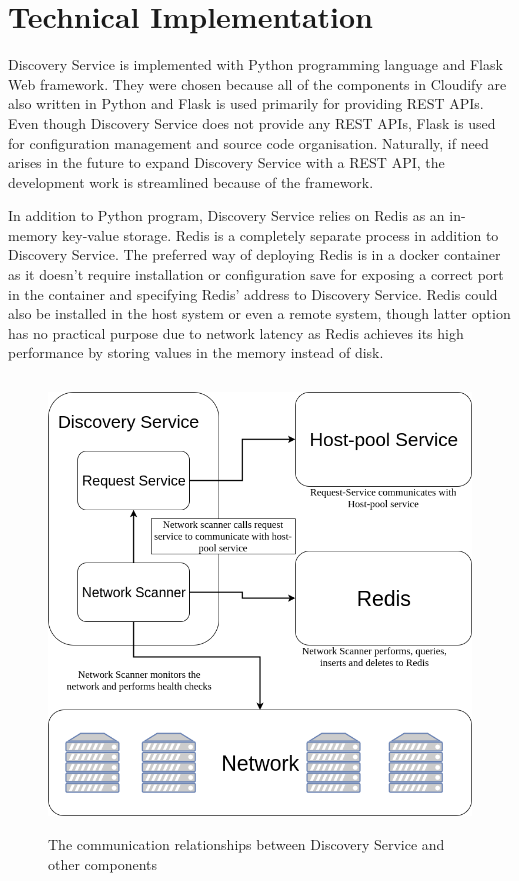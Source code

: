 \section{Technical Implementation} \label{technical_implementation}

Discovery Service is implemented with Python programming language and Flask Web framework. They were chosen because all of the components in Cloudify are also written in Python and Flask is used primarily for providing REST APIs. Even though Discovery Service does not provide any REST APIs, Flask is used for configuration management and source code organisation. Naturally, if need arises in the future to expand Discovery Service with a REST API, the development work is streamlined because of the framework.

In addition to Python program, Discovery Service relies on Redis \cite{Redis} as an in-memory key-value storage. Redis is a completely separate process in addition to Discovery Service. The preferred way of deploying Redis is in a docker container as it doesn't require installation or configuration save for exposing a correct port in the container and specifying Redis' address to Discovery Service. Redis could also be installed in the host system or even a remote system, though latter option has no practical purpose due to network latency as Redis achieves its high performance by storing values in the memory instead of disk.

\begin{figure}[ht!]
\centering
  \includegraphics[width=12cm,height=12cm, keepaspectratio]{Discovery-service-communication.png}
  \caption{The communication relationships between Discovery Service and other components}
  \label{fig:communications}
\end{figure}

